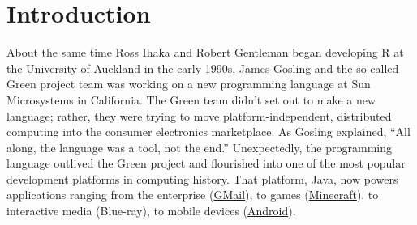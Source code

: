 \hypertarget{introduction}{\section{Introduction}}


About the same time Ross Ihaka and Robert Gentleman began developing R at the University of Auckland in the early 1990s, James Gosling and the so-called Green project team was working on a new programming language at Sun Microsystems in California. The Green team didn't set out to make a new language; rather, they were trying to move platform-independent, distributed computing into the consumer electronics marketplace. As Gosling explained, ``All along, the language was a tool, not the end.'' Unexpectedly, the programming language outlived the Green project and flourished into one of the most popular development platforms in computing history. That platform, Java, now powers applications ranging from the enterprise (\href{https://www.google.com/gmail/about/}{GMail}), to games (\href{https://minecraft.net}{Minecraft}), to interactive media (Blue-ray), to mobile devices (\href{https://www.android.com/}{Android}).

